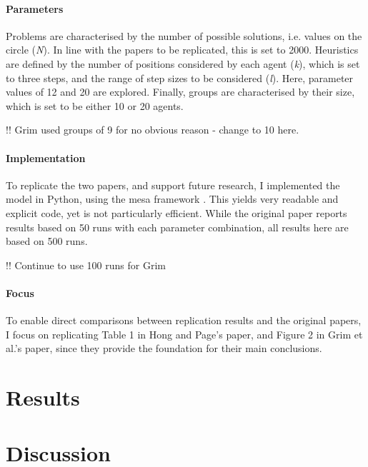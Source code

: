 \subsubsection{Parameters}

Problems are characterised by the number of possible solutions, i.e. values on the circle (\emph{N}). In line with the papers to be replicated, this is set to 2000. Heuristics are defined by the number of positions considered by each agent (\emph{k}), which is set to three steps, and the range of step sizes to be considered (\emph{l}). Here, parameter values of 12 and 20 are explored. Finally, groups are characterised by their size, which is set to be either 10 or 20 agents.

!! Grim used groups of 9 for no obvious reason - change to 10 here.

\subsubsection{Implementation}

To replicate the two papers, and support future research, I implemented the model in Python, using the mesa framework \supercite{kazil2020utilizing}. This yields very readable and explicit code, yet is not particularly efficient. While the original paper reports results based on 50 runs with each parameter combination, all results here are based on 500 runs.

!! Continue to use 100 runs for Grim

\subsubsection{Focus}

To enable direct comparisons between replication results and the original papers, I focus on replicating Table 1 in Hong and Page's paper, and Figure 2 in Grim et al.'s paper, since they provide the foundation for their main conclusions.

\chapter{Results}



\chapter{Discussion}


